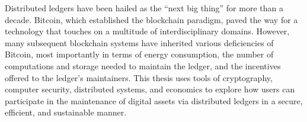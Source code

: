 \begin{laysummary}
    Distributed ledgers have been hailed as the ``next big thing'' for more
    than a decade. Bitcoin, which established the blockchain paradigm, paved
    the way for a technology that touches on a multitude of interdisciplinary
    domains. However, many subsequent blockchain systems have inherited various
    deficiencies of Bitcoin, most importantly in terms of energy consumption,
    the number of computations and storage needed to maintain the ledger, and
    the incentives offered to the ledger's maintainers. This thesis uses tools
    of cryptography, computer security, distributed systems, and economics to
    explore how users can participate in the maintenance of digital assets via
    distributed ledgers in a secure, efficient, and sustainable manner.
\end{laysummary}
